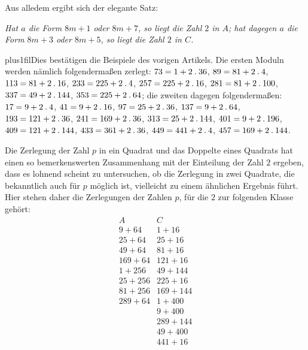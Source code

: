 Aus alledem ergibt sich der elegante Satz:

\emph{Hat $a$ die Form $8m+1$ oder $8m+7$, so liegt die Zahl $2$ in $A$; hat dagegen $a$ die Form $8m+3$ oder $8m+5$, so liegt die Zahl $2$ in $C$.}

\begingroup\rightskip=0pt plus1fil\relax Dies bestätigen die Beispiele des vorigen Artikels. Die ersten Moduln werden nämlich folgendermaßen zerlegt: \mbox{$73=1+2\mathbin{.}36$}, \mbox{$89=81+2\mathbin{.}4$}, \mbox{$113=81+2\mathbin{.}16$}, \mbox{$233=225+2\mathbin{.}4$}, \mbox{$257=225+2\mathbin{.}16$}, \mbox{$281=81+2\mathbin{.}100$}, \mbox{$337=49+2\mathbin{.}144$}, \mbox{$353=225+2\mathbin{.}64$}; die zweiten dagegen folgendermaßen: \mbox{$17=9+2\mathbin{.}4$}, \mbox{$41=9+2\mathbin{.}16$}, \mbox{$97=25+2\mathbin{.}36$}, \mbox{$137=9+2\mathbin{.}64$}, \mbox{$193=121+2\mathbin{.}36$}, \mbox{$241=169+2\mathbin{.}36$}, \mbox{$313=25+2\mathbin{.}144$}, \mbox{$401=9+2\mathbin{.}196$}, \mbox{$409=121+2\mathbin{.}144$}, \mbox{$433=361+2\mathbin{.}36$}, \mbox{$449=441+2\mathbin{.}4$}, \mbox{$457=169+2\mathbin{.}144$}.\par\endgroup

Die Zerlegung der Zahl $p$ in ein Quadrat und das Doppelte eines Quadrats hat einen so bemerkenswerten Zusammenhang mit der Einteilung der Zahl $2$ ergeben, dass es lohnend scheint zu untersuchen, ob die Zerlegung in zwei Quadrate, die bekanntlich auch für $p$ möglich ist, vielleicht zu einem ähnlichen Ergebnis führt. Hier stehen daher die Zerlegungen der Zahlen $p$, für die $2$ zur folgenden Klasse gehört:
\[
\begin{array}{c|c}
A&C\\\hline
9+64&1+16\\
25+64&25+16\\
49+64&81+16\\
169+64&121+16\\
1+256&49+144\\
25+256&225+16\\
81+256&169+144\\
289+64&1+400\\
&9+400\\
&289+144\\
&49+400\\
&441+16
\end{array}
\]

